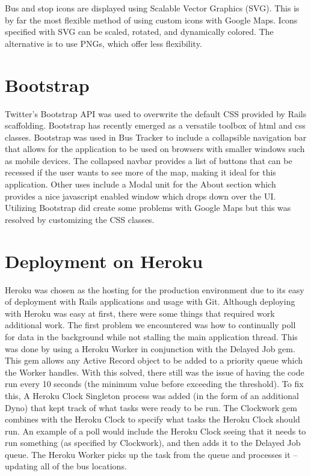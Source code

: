 \documentclass[12pt]{report}
\begin{document}
Bus and stop icons are displayed using Scalable Vector Graphics (SVG).  This is by far the most flexible method of using custom icons with Google Maps.  Icons specified with SVG can be scaled, rotated, and dynamically colored.  The alternative is to use PNGs, which offer less flexibility.  

\section{Bootstrap}

Twitter's Bootstrap API was used to overwrite the default CSS provided by Rails scaffolding.  Bootstrap has recently emerged as a versatile toolbox of html and css classes.  Bootstrap was used in Bus Tracker to include a collapsible navigation bar that allows for the application to be used on browsers with smaller windows such as mobile devices.  The collapsed navbar provides a list of buttons that can be recessed if the user wants to see more of the map, making it ideal for this application.  Other uses include a Modal unit for the About section which provides a nice javascript enabled window which drops down over the UI.  Utilizing Bootstrap did create some problems with Google Maps but this was resolved by customizing the CSS classes.
\cite{bootstrap}
\section{Deployment on Heroku}

Heroku was chosen as the hosting for the production environment due to its easy of deployment with Rails applications and usage with Git.  Although deploying with Heroku was easy at first, there were some things that required work additional work.  The first problem we encountered was how to continually poll for data in the background while not stalling the main application thread.  This was done by using a Heroku Worker in conjunction with the Delayed Job gem.  This gem allows any Active Record object to be added to a priority queue which the Worker handles.  With this solved, there still was the issue of having the code run every 10 seconds (the minimum value before exceeding the threshold).  To fix this, A Heroku Clock Singleton process was added (in the form of an additional Dyno) that kept track of what tasks were ready to be run.  The Clockwork gem combines with the Heroku Clock to specify what tasks the Heroku Clock should run.  An example of a poll would include the Heroku Clock seeing that it needs to run something (as specified by Clockwork), and then adds it to the Delayed Job queue. The Heroku Worker picks up the task from the queue and processes it -- updating all of the bus locations. \cite{heroku}
\end{document}
